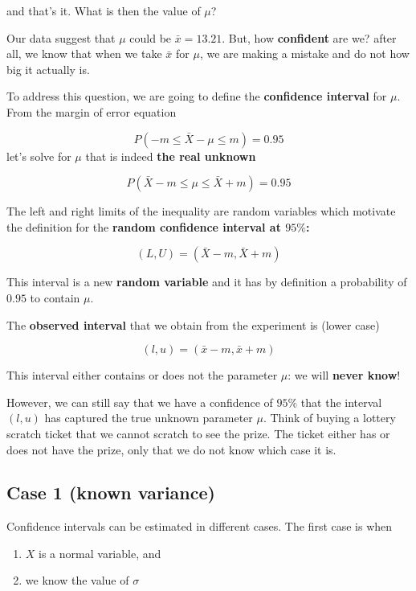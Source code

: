 \documentclass[
]{book}
\providecommand{\tightlist}{%
  \setlength{\itemsep}{0pt}\setlength{\parskip}{0pt}}
\begin{document}
and that's it. What is then the value of \(\mu\)?

Our data suggest that \(\mu\) could be \(\bar{x}=13.21\). But, how \textbf{confident} are we? after all, we know that when we take \(\bar{x}\) for \(\mu\), we are making a mistake and do not how big it actually is.

To address this question, we are going to define the \textbf{confidence interval} for \(\mu\). From the margin of error equation

\[P(-m \leq \bar{X} - \mu \leq  m)=0.95\]
let's solve for \(\mu\) that is indeed \textbf{the real unknown}

\[P(\bar{X} - m \leq \mu \leq \bar{X} + m)=0.95\]

The left and right limits of the inequality are random variables which motivate the definition for the \textbf{random confidence interval at \(95\%\):}

\[(L,U)=(\bar{X} - m,\bar{X} + m)\]

This interval is a new \textbf{random variable} and it has by definition a probability of \(0.95\) to contain \(\mu\).

The \textbf{observed interval} that we obtain from the experiment is (lower case)

\[(l,u)=(\bar{x} - m,\bar{x} + m)\]

This interval either contains or does not the parameter \(\mu\): we will \textbf{never know}!

However, we can still say that we have a confidence of \(95\%\) that the interval \((l,u)\) has captured the true unknown parameter \(\mu\). Think of buying a lottery scratch ticket that we cannot scratch to see the prize. The ticket either has or does not have the prize, only that we do not know which case it is.

\hypertarget{case-1-known-variance}{%
\subsection{Case 1 (known variance)}\label{case-1-known-variance}}

Confidence intervals can be estimated in different cases. The first case is when

\begin{enumerate}
\def\labelenumi{\arabic{enumi}.}
\tightlist
\item
  \(X\) is a normal variable, and
\item
  we know the value of \(\sigma\)
\end{enumerate}
\end{document}
